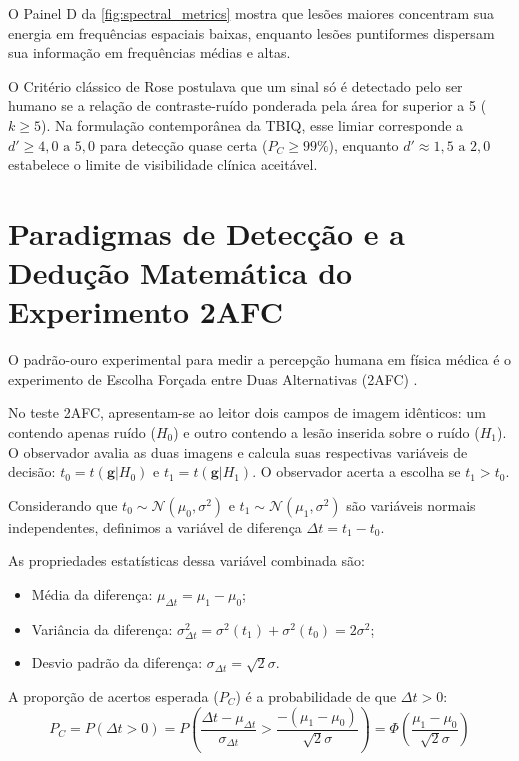 O Painel D da \cref{fig:spectral_metrics} mostra que lesões maiores concentram sua energia em frequências espaciais baixas, enquanto lesões puntiformes dispersam sua informação em frequências médias e altas.

O Critério clássico de Rose \cite{rose1948} postulava que um sinal só é detectado pelo ser humano se a relação de contraste-ruído ponderada pela área for superior a 5 ($k \ge 5$). Na formulação contemporânea da TBIQ, esse limiar corresponde a $d' \ge 4{,}0 \text{ a } 5{,}0$ para detecção quase certa ($P_C \ge 99\%$), enquanto $d' \approx 1{,}5 \text{ a } 2{,}0$ estabelece o limite de visibilidade clínica aceitável.

\section{Paradigmas de Detecção e a Dedução Matemática do Experimento 2AFC}
\label{sec:2afc_deducao}

O padrão-ouro experimental para medir a percepção humana em física médica é o experimento de Escolha Forçada entre Duas Alternativas (2AFC) \cite{burgess2011, eckstein2000}.

No teste 2AFC, apresentam-se ao leitor dois campos de imagem idênticos: um contendo apenas ruído ($H_0$) e outro contendo a lesão inserida sobre o ruído ($H_1$). O observador avalia as duas imagens e calcula suas respectivas variáveis de decisão: $t_0 = t(\mathbf{g}|H_0)$ e $t_1 = t(\mathbf{g}|H_1)$. O observador acerta a escolha se $t_1 > t_0$.

Considerando que $t_0 \sim \mathcal{N}(\mu_0, \sigma^2)$ e $t_1 \sim \mathcal{N}(\mu_1, \sigma^2)$ são variáveis normais independentes, definimos a variável de diferença $\Delta t = t_1 - t_0$.

As propriedades estatísticas dessa variável combinada são:
\begin{itemize}
  \item Média da diferença: $\mu_{\Delta t} = \mu_1 - \mu_0$;
  \item Variância da diferença: $\sigma_{\Delta t}^2 = \sigma^2(t_1) + \sigma^2(t_0) = 2\sigma^2$;
  \item Desvio padrão da diferença: $\sigma_{\Delta t} = \sqrt{2}\sigma$.
\end{itemize}

A proporção de acertos esperada ($P_C$) é a probabilidade de que $\Delta t > 0$:
\begin{equation}
  P_C = P(\Delta t > 0) = P\left( \frac{\Delta t - \mu_{\Delta t}}{\sigma_{\Delta t}} > \frac{-(\mu_1 - \mu_0)}{\sqrt{2}\sigma} \right) = \Phi\left( \frac{\mu_1 - \mu_0}{\sqrt{2}\sigma} \right)
  \label{eq:pc_2afc_step}
\end{equation}

